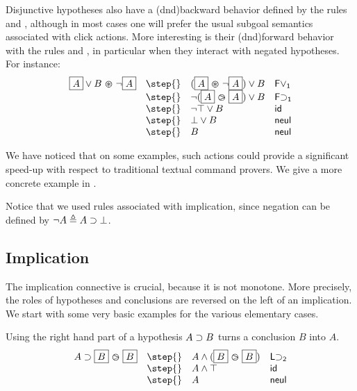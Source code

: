 Disjunctive hypotheses also have a \kl(dnd){backward} behavior defined by the rules
 and , although in most cases one will prefer the
usual subgoal semantics associated with click actions. More interesting is
their \kl(dnd){forward} behavior with the rules  and , in
particular when they interact with negated hypotheses. For instance:
$$
\begin{array}{llll}
  \select{A} \lor B \forw \neg \select{A}
    & \step{} & (\select{A} \forw \neg\select{A}) \lor B &\mathsf{F\lor_1}\\
    & \step{} & \neg (\select{A} \back \select{A}) \lor B &\mathsf{F{\limp}_1}\\
    & \step{} & \neg \top \lor B &\mathsf{id}\\
    & \step{} & \bot \lor B &\mathsf{neul}\\
    & \step{} & B &\mathsf{neul}\\
\end{array}
$$

We have noticed that on some examples, such actions could provide a
significant speed-up with respect to traditional textual command
provers. We give a more concrete example in .

Notice that we used rules associated with implication, since negation can be
defined by $\neg A \triangleq A \supset \bot$.

\subsection{Implication}
The implication connective is crucial, because it is not monotone. More
precisely, the roles of hypotheses and conclusions are reversed on the
left of an implication. We start with some very basic examples
for the various elementary cases.

Using the right hand part of a hypothesis $A\supset B$ turns a 
conclusion $B$ into $A$. 
$$
\begin{array}{llll}
  A\limp \select{B} \back \select{B} &\step{}& A\land (\select{B}
                                                \back
                                                \select{B})&\mathsf{L
                                                             {\limp}_2}\\
                                         &\step{}&A\land\top & \mathsf{id}\\
    &\step{}& A&\mathsf{neul}
\end{array}
$$

